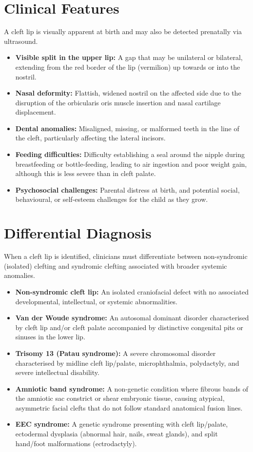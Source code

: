 \section*{Clinical Features}
A cleft lip is visually apparent at birth and may also be detected prenatally via ultrasound.
\begin{itemize}
    \item \textbf{Visible split in the upper lip:} A gap that may be unilateral or bilateral, extending from the red border of the lip (vermilion) up towards or into the nostril.
    \item \textbf{Nasal deformity:} Flattish, widened nostril on the affected side due to the disruption of the orbicularis oris muscle insertion and nasal cartilage displacement.
    \item \textbf{Dental anomalies:} Misaligned, missing, or malformed teeth in the line of the cleft, particularly affecting the lateral incisors.
    \item \textbf{Feeding difficulties:} Difficulty establishing a seal around the nipple during breastfeeding or bottle-feeding, leading to air ingestion and poor weight gain, although this is less severe than in cleft palate.
    \item \textbf{Psychosocial challenges:} Parental distress at birth, and potential social, behavioural, or self-esteem challenges for the child as they grow.
\end{itemize}

\section*{Differential Diagnosis}
When a cleft lip is identified, clinicians must differentiate between non-syndromic (isolated) clefting and syndromic clefting associated with broader systemic anomalies.
\begin{itemize}
    \item \textbf{Non-syndromic cleft lip:} An isolated craniofacial defect with no associated developmental, intellectual, or systemic abnormalities.
    \item \textbf{Van der Woude syndrome:} An autosomal dominant disorder characterised by cleft lip and/or cleft palate accompanied by distinctive congenital pits or sinuses in the lower lip.
    \item \textbf{Trisomy 13 (Patau syndrome):} A severe chromosomal disorder characterised by midline cleft lip/palate, microphthalmia, polydactyly, and severe intellectual disability.
    \item \textbf{Amniotic band syndrome:} A non-genetic condition where fibrous bands of the amniotic sac constrict or shear embryonic tissue, causing atypical, asymmetric facial clefts that do not follow standard anatomical fusion lines.
    \item \textbf{EEC syndrome:} A genetic syndrome presenting with cleft lip/palate, ectodermal dysplasia (abnormal hair, nails, sweat glands), and split hand/foot malformations (ectrodactyly).
\end{itemize}

